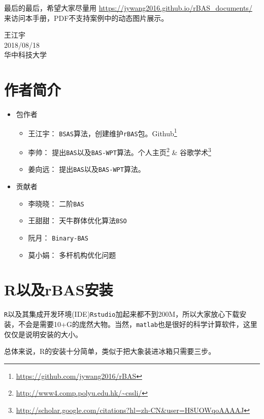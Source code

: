 \documentclass[]{ctexbook}
\providecommand{\tightlist}{%
  \setlength{\itemsep}{0pt}\setlength{\parskip}{0pt}}
\renewcommand{\href}[2]{#2\footnote{\url{#1}}}
\let\BeginKnitrBlock\begin \let\EndKnitrBlock\end
\begin{document}
最后的最后，希望大家尽量用
\url{https://jywang2016.github.io/rBAS_documents/}
来访问本手册，PDF不支持案例中的动态图片展示。

\BeginKnitrBlock{flushright}
王江宇\\
2018/08/18\\
华中科技大学
\EndKnitrBlock{flushright}

\chapter*{作者简介}\label{author}


\begin{itemize}
\tightlist
\item
  包作者

  \begin{itemize}
  \tightlist
  \item
    王江宇：
    \texttt{BSAS}算法，创建维护\texttt{rBAS}包。\href{https://github.com/jywang2016/rBAS}{Github}
  \item
    李帅：
    提出\texttt{BAS}以及\texttt{BAS-WPT}算法。\href{http://www4.comp.polyu.edu.hk/~cssli/}{个人主页}
    \&
    \href{http://scholar.google.com/citations?hl=zh-CN\&user=H8UOWqoAAAAJ}{谷歌学术}
  \item
    姜向远： 提出\texttt{BAS}以及\texttt{BAS-WPT}算法。
  \end{itemize}
\item
  贡献者

  \begin{itemize}
  \tightlist
  \item
    李晓晓： 二阶\texttt{BAS}
  \item
    王甜甜： 天牛群体优化算法\texttt{BSO}
  \item
    阮月： \texttt{Binary-BAS}
  \item
    莫小娟： 多杆机构优化问题
  \end{itemize}
\end{itemize}

\chapter{R以及rBAS安装}\label{install}

\texttt{R}以及其集成开发环境(IDE)\texttt{Rstudio}加起来都不到200M，所以大家放心下载安装，不会是需要10+G的庞然大物。当然，\texttt{matlab}也是很好的科学计算软件，这里仅仅是说明安装的大小。

总体来说，R的安装十分简单，类似于把大象装进冰箱只需要三步。
\end{document}

